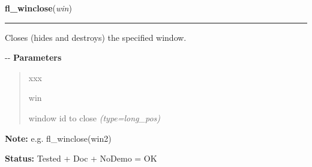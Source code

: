 \hspace{.8\funcindent}\begin{boxedminipage}{\funcwidth}

    \raggedright \textbf{fl\_winclose}(\textit{win})

    \vspace{-1.5ex}

    \rule{\textwidth}{0.5\fboxrule}
\setlength{\parskip}{2ex}

Closes (hides and destroys) the specified window.

-{}-
\setlength{\parskip}{1ex}
      \textbf{Parameters}
      \vspace{-1ex}

      \begin{quote}
        \begin{Ventry}{xxx}

          \item[win]


window id to close
            {\it (type=long\_pos)}

        \end{Ventry}

      \end{quote}

\textbf{Note:} 
e.g. fl\_winclose(win2)


\textbf{Status:} 
Tested + Doc + NoDemo = OK


    \end{boxedminipage}

    \label{xformslib:flxbasic:fl_winset}

    \vspace{0.5ex}

